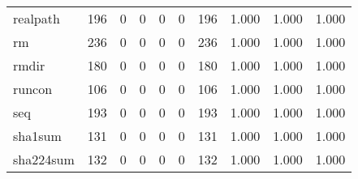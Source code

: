\begin{longtable}{lp{1.3cm}p{1.3cm}p{1.3cm}p{1.3cm}p{1.3cm}p{1.3cm}p{1.3cm}p{1.3cm}p{1.3cm}}
realpath  &                    196 &                                  0 &                                 0 &                                0 &                                 0 &                             196 &                                1.000 &                                  1.000 &                                1.000 \\
rm        &                    236 &                                  0 &                                 0 &                                0 &                                 0 &                             236 &                                1.000 &                                  1.000 &                                1.000 \\
rmdir     &                    180 &                                  0 &                                 0 &                                0 &                                 0 &                             180 &                                1.000 &                                  1.000 &                                1.000 \\
runcon    &                    106 &                                  0 &                                 0 &                                0 &                                 0 &                             106 &                                1.000 &                                  1.000 &                                1.000 \\
seq       &                    193 &                                  0 &                                 0 &                                0 &                                 0 &                             193 &                                1.000 &                                  1.000 &                                1.000 \\
sha1sum   &                    131 &                                  0 &                                 0 &                                0 &                                 0 &                             131 &                                1.000 &                                  1.000 &                                1.000 \\
sha224sum &                    132 &                                  0 &                                 0 &                                0 &                                 0 &                             132 &                                1.000 &                                  1.000 &                                1.000 \\

\end{longtable}
